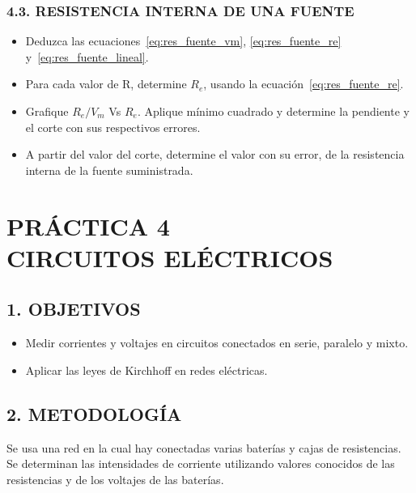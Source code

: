 \documentclass[12pt, a4paper]{article}
\begin{document}
\subsubsection*{4.3. RESISTENCIA INTERNA DE UNA FUENTE}
\begin{itemize}
    \item Deduzca las ecuaciones~\eqref{eq:res_fuente_vm}, \eqref{eq:res_fuente_re} y~\eqref{eq:res_fuente_lineal}.
    \item Para cada valor de R, determine $R_e$, usando la ecuación~\eqref{eq:res_fuente_re}.
    \item Grafique $R_e/V_m$ Vs $R_e$. Aplique mínimo cuadrado y determine la pendiente y el corte con sus respectivos errores.
    \item A partir del valor del corte, determine el valor con su error, de la resistencia interna de la fuente suministrada.
\end{itemize}

\newpage

\section*{\centering PRÁCTICA 4 \\ CIRCUITOS ELÉCTRICOS}

\subsection*{1. OBJETIVOS}
\begin{itemize}
    \item Medir corrientes y voltajes en circuitos conectados en serie, paralelo y mixto.
    \item Aplicar las leyes de Kirchhoff en redes eléctricas.
\end{itemize}

\subsection*{2. METODOLOGÍA}
Se usa una red en la cual hay conectadas varias baterías y cajas de resistencias. Se determinan las intensidades de corriente 
utilizando valores conocidos de las resistencias y de los voltajes de las baterías.
\end{document}
